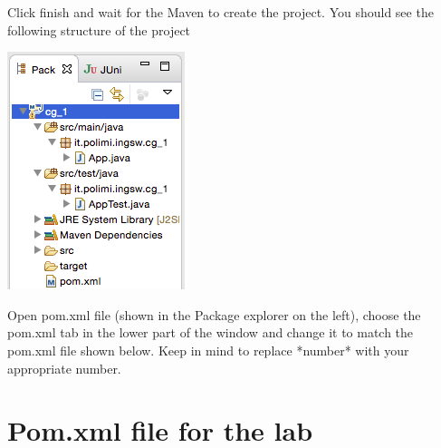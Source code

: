 \documentclass{article}
\begin{document}
\begin{compactitem}
\begin{center}
\end{center}
\item Click finish and wait for the Maven to create the project. You
  should see the following structure of the project 
\begin{center}
\includegraphics[scale=0.5]{figures/4}
\end{center}
\item Open pom.xml file (shown in the Package explorer on the left),
  choose the pom.xml tab in the lower part of the window and change it
  to match the pom.xml file shown below. Keep in mind to replace
  *number* with your appropriate number.
\end{compactitem}



\section{Pom.xml file for the lab}
\end{document}
